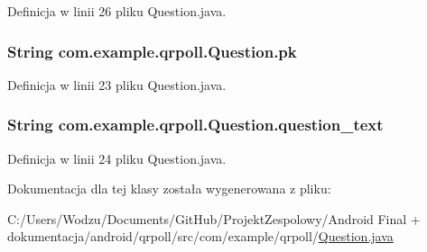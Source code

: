 Definicja w linii 26 pliku Question.\+java.

\hypertarget{classcom_1_1example_1_1qrpoll_1_1_question_ab94e31e243d24239faf4ae4c68c28f0b}{
\subsubsection[{pk}]{\setlength{\rightskip}{0pt plus 5cm}String com.\+example.\+qrpoll.\+Question.\+pk\hspace{0.3cm}{\ttfamily [private]}}}\label{classcom_1_1example_1_1qrpoll_1_1_question_ab94e31e243d24239faf4ae4c68c28f0b}


Definicja w linii 23 pliku Question.\+java.

\hypertarget{classcom_1_1example_1_1qrpoll_1_1_question_ab90d61211a23303be8fe8139aed31754}{
\subsubsection[{question\+\_\+text}]{\setlength{\rightskip}{0pt plus 5cm}String com.\+example.\+qrpoll.\+Question.\+question\+\_\+text\hspace{0.3cm}{\ttfamily [private]}}}\label{classcom_1_1example_1_1qrpoll_1_1_question_ab90d61211a23303be8fe8139aed31754}


Definicja w linii 24 pliku Question.\+java.



Dokumentacja dla tej klasy została wygenerowana z pliku\+:\begin{DoxyCompactItemize}
\item 
C\+:/\+Users/\+Wodzu/\+Documents/\+Git\+Hub/\+Projekt\+Zespolowy/\+Android Final + dokumentacja/android/qrpoll/src/com/example/qrpoll/\hyperlink{_question_8java}{Question.\+java}\end{DoxyCompactItemize}
